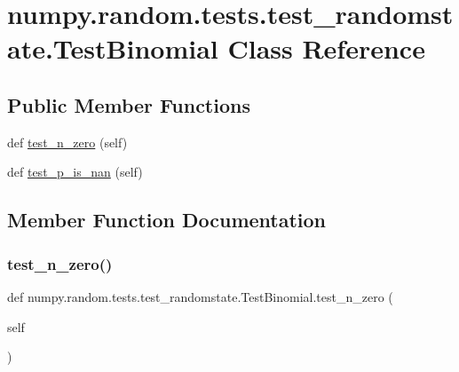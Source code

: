 \hypertarget{classnumpy_1_1random_1_1tests_1_1test__randomstate_1_1TestBinomial}{}\section{numpy.\+random.\+tests.\+test\+\_\+randomstate.\+Test\+Binomial Class Reference}
\label{classnumpy_1_1random_1_1tests_1_1test__randomstate_1_1TestBinomial}
\subsection*{Public Member Functions}
\begin{DoxyCompactItemize}
\item 
def \hyperlink{classnumpy_1_1random_1_1tests_1_1test__randomstate_1_1TestBinomial_aba7cc1adb4ef2f157afd7ac5212afb8f}{test\+\_\+n\+\_\+zero} (self)
\item 
def \hyperlink{classnumpy_1_1random_1_1tests_1_1test__randomstate_1_1TestBinomial_ae10ba6ec820ec06ed74078ec5a4a7580}{test\+\_\+p\+\_\+is\+\_\+nan} (self)
\end{DoxyCompactItemize}


\subsection{Member Function Documentation}
\mbox{\label{classnumpy_1_1random_1_1tests_1_1test__randomstate_1_1TestBinomial_aba7cc1adb4ef2f157afd7ac5212afb8f}} 
\subsubsection{\texorpdfstring{test\+\_\+n\+\_\+zero()}{test\_n\_zero()}}
{\footnotesize\ttfamily def numpy.\+random.\+tests.\+test\+\_\+randomstate.\+Test\+Binomial.\+test\+\_\+n\+\_\+zero (\begin{DoxyParamCaption}\item[{}]{self }\end{DoxyParamCaption})}

